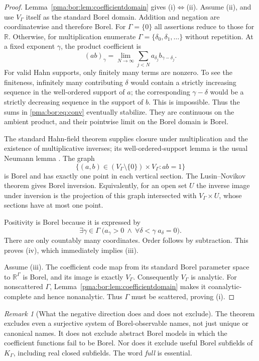 \documentclass[11pt]{article}
\numberwithin{equation}{section}
\theoremstyle{definition}
\theoremstyle{remark}
\newtheorem{remark}[remark]{Remark}
\newcommand{\R}{\mathbb R}
\begin{document}
\begin{proof}
Lemma~\ref{pma:bor:lem:coefficientdomain} gives (i)$\Leftrightarrow$(ii).
Assume (ii), and use $V_\Gamma$ itself as the standard Borel domain.
Addition and negation are coordinatewise and therefore Borel.
For $\Gamma=\{0\}$ all assertions reduce to those for $\R$. Otherwise,
for multiplication enumerate $\Gamma=\{\delta_0,\delta_1,\ldots\}$ without
repetition. At a
fixed exponent $\gamma$, the product coefficient is
\begin{equation}
\label{pma:bor:eq:conv}
 (ab)_\gamma=\lim_{N\to\infty}
 \sum_{j<N}a_{\delta_j}b_{\gamma-\delta_j}.
\end{equation}
For valid Hahn supports, only finitely many terms are nonzero. To see the
finiteness, infinitely many contributing $\delta$ would contain a strictly
increasing sequence in the well-ordered support of $a$; the corresponding
$\gamma-\delta$ would be a strictly decreasing sequence in the support of
$b$. This is impossible. Thus the sums in \eqref{pma:bor:eq:conv} eventually stabilize.
They are continuous on the ambient product, and their pointwise limit on the
Borel domain is Borel.

The standard Hahn-field theorem supplies closure under multiplication and the
existence of multiplicative inverses; its well-ordered-support lemma is the
usual Neumann lemma \cite{Neumann}. The graph
\[
 \{(a,b)\in(V_\Gamma\setminus\{0\})\times V_\Gamma:ab=1\}
\]
is Borel and has exactly one point in each vertical section. The
Lusin--Novikov theorem gives Borel inversion. Equivalently, for an open set
$U$ the inverse image under inversion is the projection of this graph
intersected with $V_\Gamma\times U$, whose sections have at most one point.

Positivity is Borel because it is expressed by
\[
 \exists\gamma\in\Gamma\;
 \bigl(a_\gamma>0\ \wedge\ \forall\delta<\gamma\;a_\delta=0\bigr).
\]
There are only countably many coordinates. Order follows by subtraction.
This proves (iv), which immediately implies (iii).

Assume (iii). The coefficient code map from its standard Borel parameter
space to $\R^\Gamma$ is Borel, and its image is exactly $V_\Gamma$.
Consequently $V_\Gamma$ is analytic. For nonscattered $\Gamma$,
Lemma~\ref{pma:bor:lem:coefficientdomain} makes it coanalytic-complete and hence
nonanalytic. Thus $\Gamma$ must be scattered, proving (i).
\end{proof}

\begin{remark}[What the negative direction does and does not exclude]
The theorem excludes even a surjective system of Borel-observable names, not
just unique or canonical names. It does not exclude abstract Borel models in
which the coefficient functions fail to be Borel. Nor does it exclude useful
Borel subfields of $K_\Gamma$, including real closed subfields. The word
\emph{full} is essential.
\end{remark}
\end{document}
